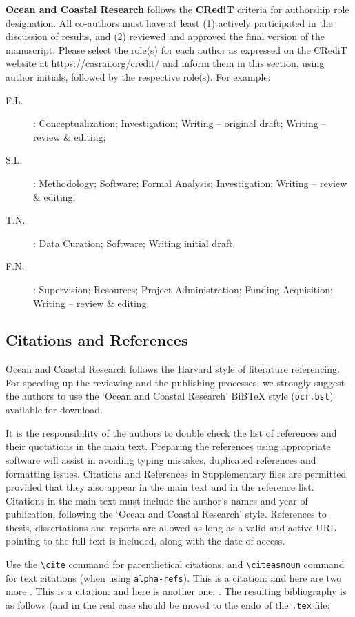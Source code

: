 \documentclass[draft]{OCR}
\begin{document}
{\bfseries Ocean and Coastal Research} follows the {\bfseries CRediT} criteria for authorship role
designation. All co-authors must have at least (1) actively participated in the discussion of
results, and (2) reviewed and approved the final version of the manuscript. Please select the
role(s) for each author as expressed on the CRediT website at https://casrai.org/credit/ and inform
them in this section, using author initials, followed by the respective role(s).  For example:

\begin{description}
\item[F.L.]: Conceptualization; Investigation; Writing – original draft; Writing – review \&
  editing;
\item[S.L.]: Methodology; Software; Formal Analysis; Investigation; Writing – review \&
  editing;
\item[T.N.]: Data Curation; Software; Writing initial draft. 
\item[F.N.]: Supervision; Resources; Project Administration; Funding Acquisition; Writing – review
  \& editing.
\end{description}

\subsection{Citations and References}

Ocean and Coastal Research follows the Harvard style of literature referencing. For speeding up the
reviewing and the publishing processes, we strongly suggest the authors to use the ‘Ocean and
Coastal Research’ BiB\TeX\/ style (\texttt{ocr.bst}) available for download.

It is the responsibility of the authors to double check the list of references and their quotations
in the main text. Preparing the references using appropriate software will assist in avoiding typing
mistakes, duplicated references and formatting issues. Citations and References in Supplementary
files are permitted provided that they also appear in the main text and in the reference
list. Citations in the main text must include the author's names and year of publication, following
the ‘Ocean and Coastal Research’ style. References to thesis, dissertations and reports are allowed
as long as a valid and active URL pointing to the full text is included, along with the date of
access.


Use the \verb|\cite| command for parenthetical citations, and \verb|\citeasnoun| command for text
citations (when using \verb|alpha-refs|).  This is a citation: \cite{Fan:2004} and here are two more
\cite{Cox:1972,Hear:Holm:Step:quan:2006}.  This is a citation: \cite*{Fan:2004} and here is another
one: . The resulting bibliography is as follows (and in the real case should be moved to the endo of the \texttt{.tex} file:
\end{document}
